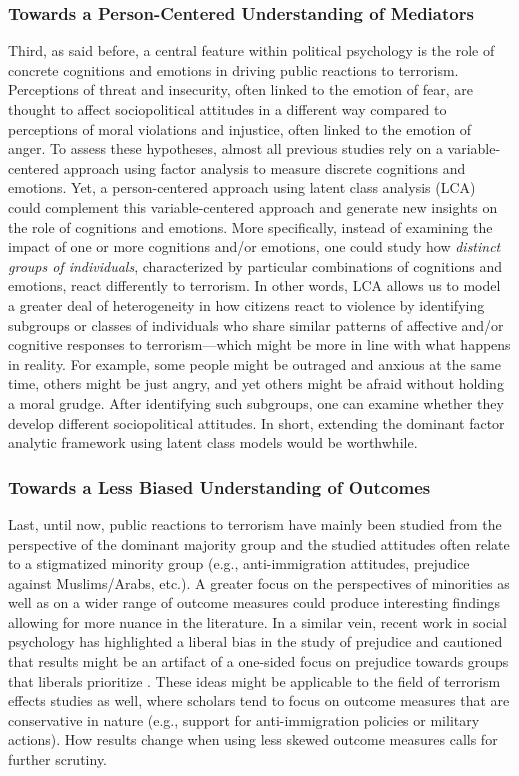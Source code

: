 \subsubsection{Towards a Person-Centered Understanding of Mediators}
Third, as said before, a central feature within political psychology is the role of concrete cognitions and emotions in driving public reactions to terrorism. Perceptions of threat and insecurity, often linked to the emotion of fear, are thought to affect sociopolitical attitudes in a different way compared to perceptions of moral violations and injustice, often linked to the emotion of anger. To assess these hypotheses, almost all previous studies rely on a variable-centered approach using factor analysis to measure discrete cognitions and emotions. Yet, a person-centered approach using latent class analysis (LCA) could complement this variable-centered approach and generate new insights on the role of cognitions and emotions. More specifically, instead of examining the impact of one or more cognitions and/or emotions, one could study how \textit{distinct groups of individuals}, characterized by particular combinations of cognitions and emotions, react differently to terrorism. In other words, LCA allows us to model a greater deal of heterogeneity in how citizens react to violence by identifying subgroups or classes of individuals who share similar patterns of affective and/or cognitive responses to terrorism---which might be more in line with what happens in reality. For example, some people might be outraged and anxious at the same time, others might be just angry, and yet others might be afraid without holding a moral grudge. After identifying such subgroups, one can examine whether they develop different sociopolitical attitudes. In short, extending the dominant factor analytic framework using latent class models would be worthwhile.


\subsubsection{Towards a Less Biased Understanding of Outcomes}
Last, until now, public reactions to terrorism have mainly been studied from the perspective of the dominant majority group and the studied attitudes often relate to a stigmatized minority group (e.g., anti-immigration attitudes, prejudice against Muslims/Arabs, etc.). A greater focus on the perspectives of minorities as well as on a wider range of outcome measures could produce interesting findings allowing for more nuance in the literature. In a similar vein, recent work in social psychology has highlighted a liberal bias in the study of prejudice and cautioned that results might be an artifact of a one-sided focus on prejudice towards groups that liberals prioritize \citep{Brandt2014a, Reyna2018}. These ideas might be applicable to the field of terrorism effects studies as well, where scholars tend to focus on outcome measures that are conservative in nature (e.g., support for anti-immigration policies or military actions). How results change when using less skewed outcome measures calls for further scrutiny.



